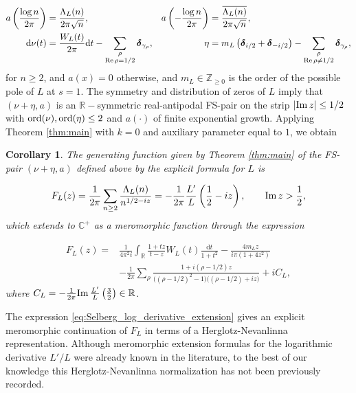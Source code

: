 \documentclass[a4paper,reqno,12pt]{amsart}
\newtheorem{corollary}[theorem]{Corollary}
\newcommand{\z}{\mathbb{Z}}
\renewcommand{\r}{\mathbb{R}}
\newcommand{\cp}{\mathbb{C}} %
\newcommand{\bo}{\boldsymbol}
\newcommand{\ga}{\gamma}
\newcommand{\ord}{{\rm ord}}
\renewcommand{\d}{\mathrm{d}}
\newcommand{\ov}[1]{\overline{#1}}
\newcommand{\cd}{\cdot}
\newcommand{\1}{{\bf 1}}
\newcommand{\del}{{\bo \delta}}
\renewcommand{\Re}{{\rm Re}\,}
\renewcommand{\Im}{{\rm Im}\,}
\begin{document}
\begin{align*}
    a\left(\frac{\log n}{2\pi}\right)
    &=\frac{\Lambda_L(n)}{2\pi\sqrt n},
    &
    a\left(-\frac{\log n}{2\pi}\right)
    &=\frac{\ov{\Lambda_L(n)}}{2\pi\sqrt n},\\
    \d\nu(t)
    &=\frac{W_L(t)}{2\pi}\d t
      -\sum_{\substack{\rho\\ \Re\rho=1/2}}\del_{\ga_\rho},
    &
    \eta
    &=m_L\left(\del_{i/2}+\del_{-i/2}\right)
      -\sum_{\substack{\rho\\ \Re\rho\neq1/2}}\del_{\ga_\rho},
\end{align*}
for $n\geq2$, and $a(x)=0$ otherwise, and $m_L\in\z_{\geq0}$ is the order of the possible pole of $L$ at $s=1$. The symmetry and distribution of zeros of $L$ imply that $(\nu+\eta,a)$ is an $\r-$symmetric real-antipodal FS-pair on the strip $|\Im{z}|\leq1/2$ with $\ord(\nu),\ord(\eta)\leq 2$ and $a(\cd)$ of finite exponential growth. Applying Theorem \ref{thm:main} with $k=0$ and auxiliary parameter equal to $1$, we obtain
\begin{corollary}
    \label{cor:Selberg_example}
    The generating function given by Theorem \ref{thm:main} of the FS-pair $(\nu+\eta,a)$ defined above by the explicit formula for $L$ is
    
    \begin{equation}
    F_L(z)=\frac{1}{2\pi}\sum_{n\geq2}
    \frac{\Lambda_L(n)}{n^{1/2-iz}}
    =-\frac{1}{2\pi}\frac{L'}{L}\left(\frac12-iz\right),
    \qquad \Im z>\frac12,
\end{equation}
which extends to $\cp^+$ as a meromorphic function through the expression

\begin{align}
\label{eq:Selberg_log_derivative_extension}
    F_L(z)=&\frac{1}{4\pi^2 i}\int_{\r}
    \frac{1+tz}{t-z}W_L(t)\frac{\d t}{1+t^2}
    -\frac{4m_Lz}{i\pi(1+4z^2)}\\
    &-\frac{1}{2\pi}\sum_{\rho}
    \frac{1+i(\rho-1/2)z}
    {\bigl((\rho-1/2)^2-1\bigr)\bigl((\rho-1/2)+iz\bigr)}
    +iC_L,
\end{align}
where $C_L=-\frac{1}{2\pi}\Im\frac{L'}{L}\left(\frac32\right)\in\r$.
\end{corollary}
The expression \eqref{eq:Selberg_log_derivative_extension} gives an explicit meromorphic continuation of $F_L$ in terms of a Herglotz-Nevanlinna representation. Although meromorphic extension formulas for the logarithmic derivative $L'/L$ were already known in the literature, to the best of our knowledge this Herglotz-Nevanlinna normalization has not been previously recorded.
\end{document}
